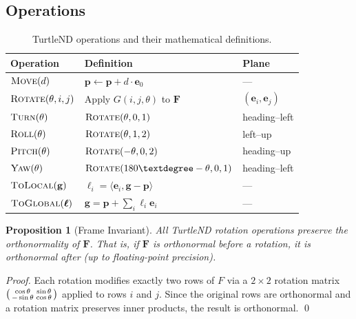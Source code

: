 \documentclass[11pt,letterpaper]{article}
\newtheorem{proposition}{Proposition}[section]
\newcommand{\frame}{\mathbf{F}}
\newcommand{\pos}{\mathbf{p}}
\newcommand{\basis}{\mathbf{e}}
\begin{document}
\subsection{Operations}

\begin{table}[h]
\centering
\caption{TurtleND operations and their mathematical definitions.}
\label{tab:ops}
\begin{tabular}{@{}lll@{}}
\toprule
\textbf{Operation} & \textbf{Definition} & \textbf{Plane} \\
\midrule
$\textsc{Move}(d)$ & $\pos \leftarrow \pos + d \cdot \basis_0$ & --- \\
$\textsc{Rotate}(\theta, i, j)$ & Apply $G(i, j, \theta)$ to $\frame$ & $(\basis_i, \basis_j)$ \\
$\textsc{Turn}(\theta)$ & $\textsc{Rotate}(\theta, 0, 1)$ & heading--left \\
$\textsc{Roll}(\theta)$ & $\textsc{Rotate}(\theta, 1, 2)$ & left--up \\
$\textsc{Pitch}(\theta)$ & $\textsc{Rotate}(-\theta, 0, 2)$ & heading--up \\
$\textsc{Yaw}(\theta)$ & $\textsc{Rotate}(180° - \theta, 0, 1)$ & heading--left \\
$\textsc{ToLocal}(\mathbf{g})$ & $\ell_i = \langle \basis_i, \mathbf{g} - \pos \rangle$ & --- \\
$\textsc{ToGlobal}(\bm{\ell})$ & $\mathbf{g} = \pos + \sum_i \ell_i \basis_i$ & --- \\
\bottomrule
\end{tabular}
\end{table}

\begin{proposition}[Frame Invariant]
\label{prop:frame}
All TurtleND rotation operations preserve the orthonormality of $\frame$.
That is, if $\frame$ is orthonormal before a rotation, it is orthonormal
after (up to floating-point precision).
\end{proposition}

\begin{proof}
Each rotation modifies exactly two rows of $F$ via a $2 \times 2$ rotation
matrix $\begin{psmallmatrix} \cos\theta & \sin\theta \\ -\sin\theta & \cos\theta \end{psmallmatrix}$
applied to rows $i$ and $j$. Since the original rows are orthonormal and
a rotation matrix preserves inner products, the result is orthonormal. \qed
\end{proof}
\end{document}

